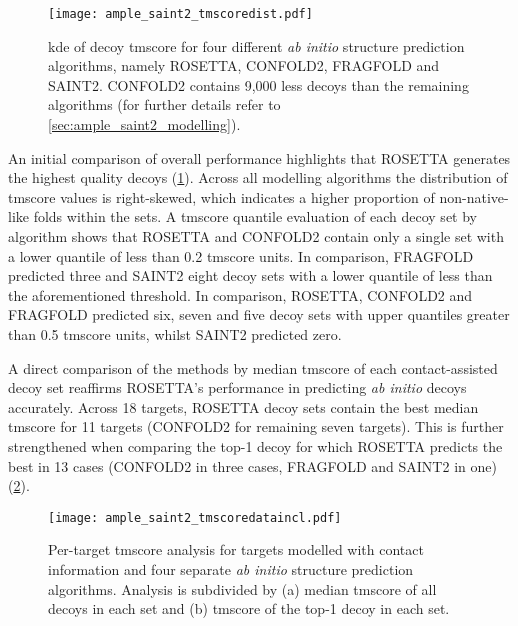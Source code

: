 \begin{figure}[H]
    \centering
    \texttt{[image: ample\_saint2\_tmscoredist.pdf]}
    \caption[Distribution of decoy TM-scores for four modelling algorithms]{\gls{kde} of decoy \gls{tmscore} for four different \textit{ab initio} structure prediction algorithms, namely ROSETTA, CONFOLD2, FRAGFOLD and SAINT2. CONFOLD2 contains 9,000 less decoys than the remaining algorithms (for further details refer to \cref{sec:ample_saint2_modelling}).}
    \label{fig:ample_saint2_tmscoredist}
\end{figure}

An initial comparison of overall performance highlights that ROSETTA generates the highest quality decoys (\cref{fig:ample_saint2_tmscoredist}). Across all modelling algorithms the distribution of \gls{tmscore} values is right-skewed, which indicates a higher proportion of non-native-like folds within the sets. A \gls{tmscore} quantile evaluation of each decoy set by algorithm shows that ROSETTA and CONFOLD2 contain only a single set with a lower quantile of less than 0.2 \gls{tmscore} units. In comparison, FRAGFOLD predicted three and SAINT2 eight decoy sets with a lower quantile of less than the aforementioned threshold. In comparison, ROSETTA, CONFOLD2 and FRAGFOLD predicted six, seven and five decoy sets with upper quantiles greater than 0.5 \gls{tmscore} units, whilst SAINT2 predicted zero.

A direct comparison of the methods by median \gls{tmscore} of each contact-assisted decoy set reaffirms ROSETTA's performance in predicting \textit{ab initio} decoys accurately. Across 18 targets, ROSETTA decoy sets contain the best median \gls{tmscore} for 11 targets (CONFOLD2 for remaining seven targets). This is further strengthened when comparing the top-1 decoy for which ROSETTA predicts the best in 13 cases (CONFOLD2 in three cases, FRAGFOLD and SAINT2 in one) (\cref{fig:ample_saint2_tmscoredataincl}).

\begin{figure}[H]
    \centering
    \texttt{[image: ample\_saint2\_tmscoredataincl.pdf]}
    \caption[Per-target TM-score analysis for four modelling algorithms with contacts]{Per-target \gls{tmscore} analysis for targets modelled with contact information and four separate \textit{ab initio} structure prediction algorithms. Analysis is subdivided by (a) median \gls{tmscore} of all decoys in each set and (b) \gls{tmscore} of the top-1 decoy in each set.}
    \label{fig:ample_saint2_tmscoredataincl}
\end{figure}

